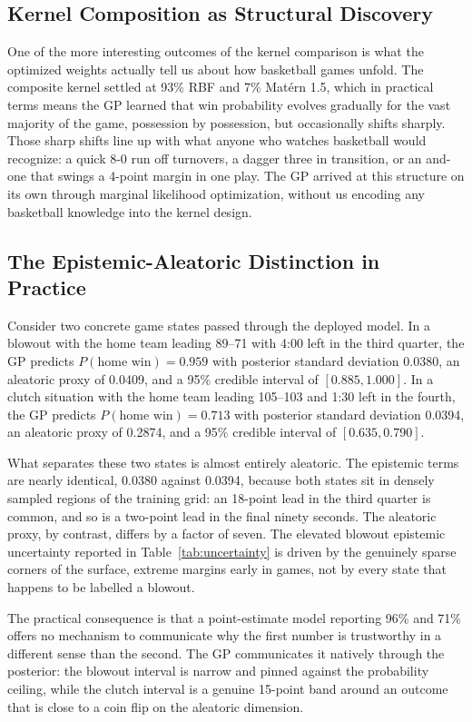\documentclass[conference]{IEEEtran}
\begin{document}
\subsection{Kernel Composition as Structural Discovery}

One of the more interesting outcomes of the kernel comparison is what the optimized weights actually tell us about how basketball games unfold. The composite kernel settled at 93\% RBF and 7\% Mat\'{e}rn 1.5, which in practical terms means the GP learned that win probability evolves gradually for the vast majority of the game, possession by possession, but occasionally shifts sharply. Those sharp shifts line up with what anyone who watches basketball would recognize: a quick 8-0 run off turnovers, a dagger three in transition, or an and-one that swings a 4-point margin in one play. The GP arrived at this structure on its own through marginal likelihood optimization, without us encoding any basketball knowledge into the kernel design.

\subsection{The Epistemic-Aleatoric Distinction in Practice}

Consider two concrete game states passed through the deployed model. In a blowout with the home team leading 89--71 with 4:00 left in the third quarter, the GP predicts $P(\text{home win}) = 0.959$ with posterior standard deviation 0.0380, an aleatoric proxy of 0.0409, and a 95\% credible interval of $[0.885, 1.000]$. In a clutch situation with the home team leading 105--103 and 1:30 left in the fourth, the GP predicts $P(\text{home win}) = 0.713$ with posterior standard deviation 0.0394, an aleatoric proxy of 0.2874, and a 95\% credible interval of $[0.635, 0.790]$.

What separates these two states is almost entirely aleatoric. The epistemic terms are nearly identical, 0.0380 against 0.0394, because both states sit in densely sampled regions of the training grid: an 18-point lead in the third quarter is common, and so is a two-point lead in the final ninety seconds. The aleatoric proxy, by contrast, differs by a factor of seven. The elevated blowout epistemic uncertainty reported in Table~\ref{tab:uncertainty} is driven by the genuinely sparse corners of the surface, extreme margins early in games, not by every state that happens to be labelled a blowout.

The practical consequence is that a point-estimate model reporting 96\% and 71\% offers no mechanism to communicate why the first number is trustworthy in a different sense than the second. The GP communicates it natively through the posterior: the blowout interval is narrow and pinned against the probability ceiling, while the clutch interval is a genuine 15-point band around an outcome that is close to a coin flip on the aleatoric dimension.
\end{document}
